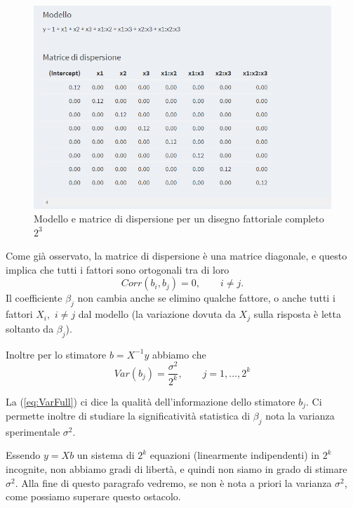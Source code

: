 \documentclass[
]{book}
\begin{document}
\begin{figure}

{\centering \includegraphics[width=1\linewidth]{Immagini/03_matr_disp} 

}

\caption{Modello e matrice di dispersione per un disegno fattoriale completo $2^3$\label{fig3}}\label{fig:unnamed-chunk-5}
\end{figure}

Come già osservato, la matrice di dispersione è una matrice diagonale, e questo implica che tutti i fattori sono ortogonali tra di loro
\begin{equation}\label{eq:CorrFull}
    Corr(b_i,b_j)=0, \qquad i\neq j.
\end{equation}
Il coefficiente \(\beta_j\) non cambia anche se elimino qualche fattore, o anche tutti i fattori \(X_i,\) \(i\neq j\) dal modello (la variazione dovuta da \(X_j\) sulla risposta è letta soltanto da \(\beta_j\)).

Inoltre per lo stimatore \(b=X^{-1}y\) abbiamo che
\begin{equation}\label{eq:VarFull}
    Var(b _j)=\frac{\sigma^2}{2^k}, \qquad j=1,\dots,2^k
\end{equation}

La (\ref{eq:VarFull}) ci dice la qualità dell'informazione dello stimatore \(b_j\). Ci permette inoltre di studiare la significatività statistica di \(\beta_j\) nota la varianza sperimentale \(\sigma^2\).

Essendo \(y=Xb\) un sistema di \(2^k\) equazioni (linearmente indipendenti) in \(2^k\) incognite, non abbiamo gradi di libertà, e quindi non siamo in grado di stimare \(\sigma^2\). Alla fine di questo paragrafo vedremo, se non è nota a priori la varianza \(\sigma^2\), come possiamo superare questo ostacolo.
\end{document}
